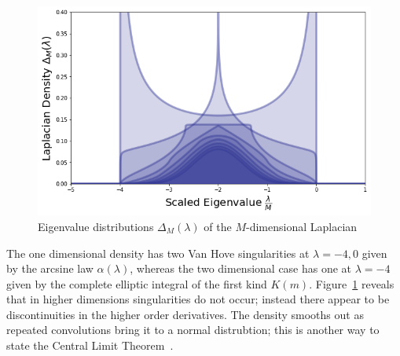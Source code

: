 \documentclass{article}[12pt]
\numberwithin{equation}{section}
\begin{document}
\begin{figure}[H]
\centering{}
\captionsetup{justification=centering}
\includegraphics[scale=0.4]{figures/density}
\caption{Eigenvalue distributions $\Delta_M(\lambda)$ of the $M$-dimensional Laplacian}
\label{fig:dos}
\end{figure}
The one dimensional density has two Van Hove singularities at $\lambda=-4,0$
given by the arcsine law $\alpha(\lambda)$, whereas the two dimensional
case has one at $\lambda=-4$ given by the complete elliptic integral
of the first kind $K(m)$. Figure~\ref{fig:dos} reveals that in higher
dimensions singularities do not occur; instead there appear to be
discontinuities in the higher order derivatives. The density smooths out
as repeated convolutions bring it to a normal distrubtion; this is another
way to state the Central Limit Theorem~\cite{}.
\end{document}
